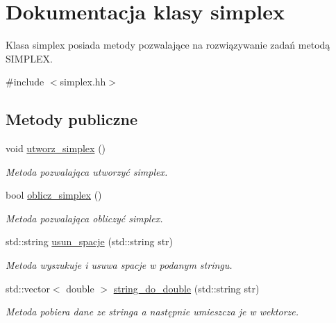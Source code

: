 \hypertarget{classsimplex}{\section{\-Dokumentacja klasy simplex}
\label{classsimplex}
}


\-Klasa simplex posiada metody pozwalające na rozwiązywanie zadań metodą \-S\-I\-M\-P\-L\-E\-X.  




{\ttfamily \#include $<$simplex.\-hh$>$}

\subsection*{\-Metody publiczne}
\begin{DoxyCompactItemize}
\item 
void \hyperlink{classsimplex_ae457957b7d98c0255c2c9a1815d0d946}{utworz\-\_\-simplex} ()
\begin{DoxyCompactList}\small\item\em \-Metoda pozwalająca utworzyć simplex. \end{DoxyCompactList}\item 
bool \hyperlink{classsimplex_af8b23fa72bedc783683619fd4799ab2f}{oblicz\-\_\-simplex} ()
\begin{DoxyCompactList}\small\item\em \-Metoda pozwalająca obliczyć simplex. \end{DoxyCompactList}\item 
std\-::string \hyperlink{classsimplex_ab7350fae23b0a0a756c3b2f36d02e0d4}{usun\-\_\-spacje} (std\-::string str)
\begin{DoxyCompactList}\small\item\em \-Metoda wyszukuje i usuwa spacje w podanym stringu. \end{DoxyCompactList}\item 
std\-::vector$<$ double $>$ \hyperlink{classsimplex_afd209ac8a4361ad8e137bd8f8dfd76c8}{string\-\_\-do\-\_\-double} (std\-::string str)
\begin{DoxyCompactList}\small\item\em \-Metoda pobiera dane ze stringa a następnie umieszcza je w wektorze. \end{DoxyCompactList}\end{DoxyCompactItemize}
